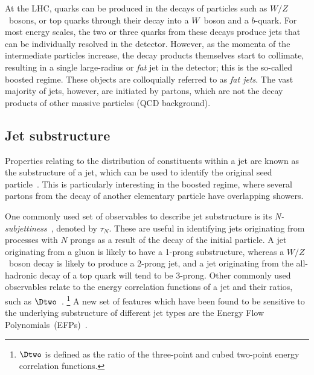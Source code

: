 At the LHC, quarks can be produced in the decays of particles such as $W/Z$~bosons, or top quarks through their decay into a $W$~boson and a $b$-quark.
For most energy scales, the two or three quarks from these decays produce jets that can be individually resolved in the detector.
However, as the momenta of the intermediate particles increase, the decay products themselves start to collimate, resulting in a single large-radius or \textit{fat} jet in the detector; this is the so-called boosted regime.
These objects are colloquially referred to as \textit{fat jets}.
The vast majority of jets, however, are initiated by partons, which are not the decay products of other massive particles (QCD background).

\subsection{Jet substructure}
\label{sec:jet_substructure}

Properties relating to the distribution of constituents within a jet are known as the substructure of a jet, which can be used to identify the original seed particle~\cite{Kogler:2018hem}.
This is particularly interesting in the boosted regime, where several partons from the decay of another elementary particle have overlapping showers.

One commonly used set of observables to describe jet substructure is its \emph{N-subjettiness}~\cite{Thaler_2011}, denoted by ${\tau_N}$.
These are useful in identifying jets originating from processes with $N$ prongs as a result of the decay of the initial particle.
A jet originating from a gluon is likely to have a 1-prong substructure, whereas a $W/Z$~boson decay is likely to produce a 2-prong jet, and a jet originating from the all-hadronic decay of a top quark will tend to be 3-prong.
Other commonly used observables relate to the energy correlation functions of a jet and their ratios, such as $\Dtwo$~\cite{Larkoski_2013,Larkoski_2014}.%
\footnote{$\Dtwo$ is defined as the ratio of the three-point and cubed two-point energy correlation functions.}
A new set of features which have been found to be sensitive to the underlying substructure of different jet types are the Energy Flow Polynomials~(EFPs)~\cite{Komiske_2018}.

